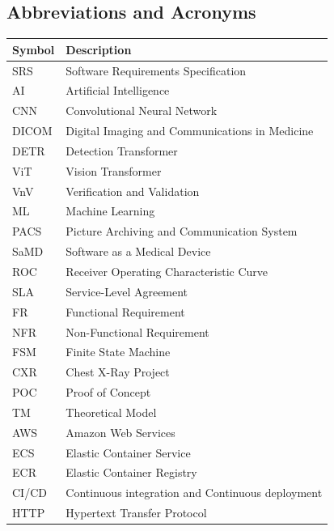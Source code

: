 \documentclass[12pt, titlepage]{article}
\begin{document}
\subsection{Abbreviations and Acronyms}
\renewcommand{\arraystretch}{1.3}
\noindent \begin{tabular}{l l} 
  \toprule		
  \textbf{Symbol} & \textbf{Description}\\
  \midrule 
  SRS & Software Requirements Specification\\
  AI & Artificial Intelligence\\
  CNN & Convolutional Neural Network\\
  DICOM & Digital Imaging and Communications in Medicine\\
  DETR & Detection Transformer\\
  ViT & Vision Transformer\\
  VnV & Verification and Validation\\
  ML & Machine Learning\\
  PACS & Picture Archiving and Communication System\\
  SaMD & Software as a Medical Device\\
  ROC & Receiver Operating Characteristic Curve\\
  SLA & Service-Level Agreement\\
  FR & Functional Requirement\\
  NFR & Non-Functional Requirement\\
  FSM & Finite State Machine\\
  CXR & Chest X-Ray Project\\
  POC & Proof of Concept\\
  TM & Theoretical Model\\
  AWS & Amazon Web Services\\
  ECS & Elastic Container Service\\
  ECR & Elastic Container Registry\\
  CI/CD & Continuous integration and Continuous deployment\\
  HTTP & Hypertext Transfer Protocol\\
  
  \bottomrule
\end{tabular}

\newpage

\tableofcontents

\listoftables %

\listoffigures %
\end{document}
